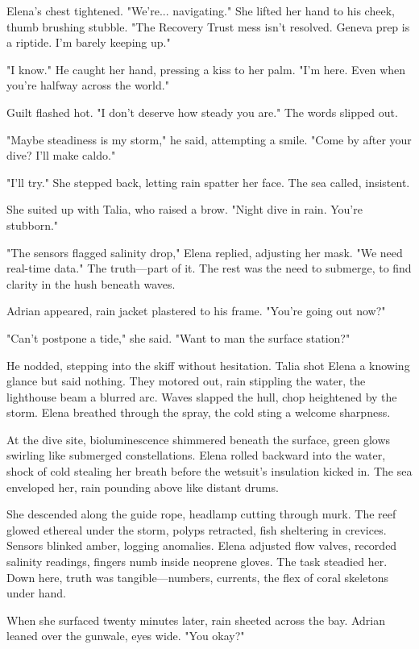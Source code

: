 Elena's chest tightened. "We're... navigating." She lifted her hand to his cheek, thumb brushing stubble. "The Recovery Trust mess isn't resolved. Geneva prep is a riptide. I'm barely keeping up."

"I know." He caught her hand, pressing a kiss to her palm. "I'm here. Even when you're halfway across the world."

Guilt flashed hot. "I don't deserve how steady you are." The words slipped out.

"Maybe steadiness is my storm," he said, attempting a smile. "Come by after your dive? I'll make caldo."

"I'll try." She stepped back, letting rain spatter her face. The sea called, insistent.

She suited up with Talia, who raised a brow. "Night dive in rain. You're stubborn."

"The sensors flagged salinity drop," Elena replied, adjusting her mask. "We need real-time data." The truth—part of it. The rest was the need to submerge, to find clarity in the hush beneath waves.

Adrian appeared, rain jacket plastered to his frame. "You're going out now?"

"Can't postpone a tide," she said. "Want to man the surface station?"

He nodded, stepping into the skiff without hesitation. Talia shot Elena a knowing glance but said nothing. They motored out, rain stippling the water, the lighthouse beam a blurred arc. Waves slapped the hull, chop heightened by the storm. Elena breathed through the spray, the cold sting a welcome sharpness.

At the dive site, bioluminescence shimmered beneath the surface, green glows swirling like submerged constellations. Elena rolled backward into the water, shock of cold stealing her breath before the wetsuit's insulation kicked in. The sea enveloped her, rain pounding above like distant drums.

She descended along the guide rope, headlamp cutting through murk. The reef glowed ethereal under the storm, polyps retracted, fish sheltering in crevices. Sensors blinked amber, logging anomalies. Elena adjusted flow valves, recorded salinity readings, fingers numb inside neoprene gloves. The task steadied her. Down here, truth was tangible—numbers, currents, the flex of coral skeletons under hand.

When she surfaced twenty minutes later, rain sheeted across the bay. Adrian leaned over the gunwale, eyes wide. "You okay?"

